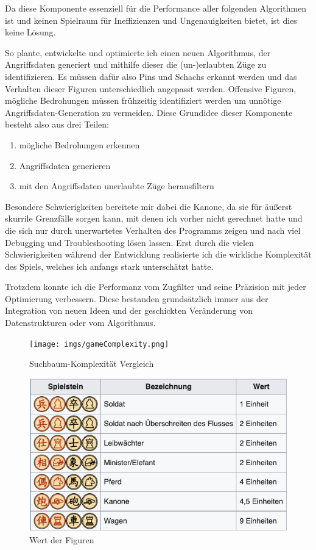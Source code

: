 \documentclass{jpp}
\begin{document}
Da diese Komponente essenziell für die Performance aller folgenden Algorithmen ist und keinen Spielraum für Ineffizienzen und Ungenauigkeiten bietet, ist dies keine Lösung.

So plante, entwickelte und optimierte ich einen neuen Algorithmus, der Angriffsdaten generiert und mithilfe dieser die (un-)erlaubten Züge zu identifizieren.
Es müssen dafür also Pins und Schachs erkannt werden und das Verhalten dieser Figuren unterschiedlich angepasst werden. Offensive Figuren, mögliche Bedrohungen müssen frühzeitig identifiziert werden um unnötige Angriffsdaten-Generation zu vermeiden.
Diese Grundidee dieser Komponente besteht also aus drei Teilen:
\begin{enumerate}
    \item mögliche Bedrohungen erkennen
    \item Angriffsdaten generieren
    \item mit den Angriffsdaten unerlaubte Züge herausfiltern
\end{enumerate}

Besondere Schwierigkeiten bereitete mir dabei die Kanone, da sie für äußerst skurrile Grenzfälle sorgen kann, mit denen ich vorher nicht gerechnet hatte und die sich nur durch unerwartetes Verhalten des Programms zeigen und nach viel Debugging und Troubleshooting lösen lassen. Erst durch die vielen Schwierigkeiten während der Entwicklung realisierte ich die wirkliche Komplexität des Spiels, welches ich anfangs stark unterschätzt hatte.

Trotzdem konnte ich die Performanz vom Zugfilter und seine Präzision mit jeder Optimierung verbessern. Diese bestanden grundsätzlich immer aus der Integration von neuen Ideen und der geschickten Veränderung von Datenstrukturen oder vom Algorithmus.

\begin{figure}
  \centering
    \begin{minipage}{0.49\textwidth}
    \texttt{[image: imgs/gameComplexity.png]}
    \caption{Suchbaum-Komplexität Vergleich}
    \label{fig:gameComplexity}
  \end{minipage}
  \hfill
  \begin{minipage}{0.49\textwidth}
    \centering
    \includegraphics[width={\textwidth}]{imgs/Wert.png}
    \caption{Wert der Figuren}
    \label{fig:wert}
  \end{minipage}
\end{figure}
\end{document}
